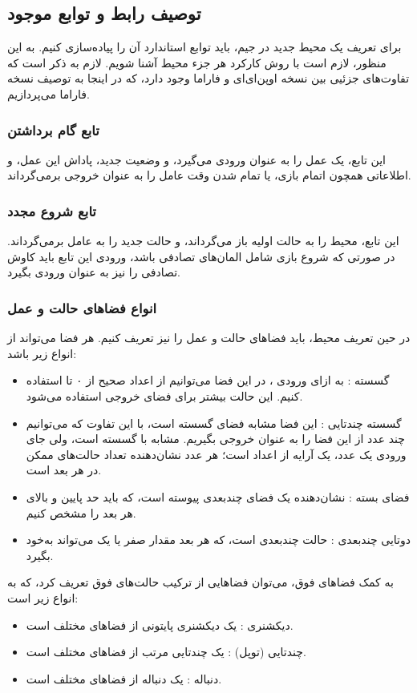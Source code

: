 \subsection{توصیف رابط و توابع موجود}
برای تعریف یک محیط جدید در جیم،
باید توابع استاندارد آن را پیاده‌سازی کنیم. به این منظور، لازم است با روش کارکرد هر جزء محیط آشنا شویم.
لازم به ذکر است که تفاوت‌های جزئیی بین نسخه اوپن‌ای‌ای و فاراما وجود دارد، که در اینجا به توصیف نسخه فاراما می‌پردازیم.
\subsubsection{تابع گام برداشتن}
این تابع، یک عمل را به عنوان ورودی می‌گیرد،
و وضعیت جدید، پاداش این عمل، و اطلاعاتی همچون اتمام بازی، یا تمام شدن وقت عامل را به عنوان خروجی برمی‌گرداند.
\subsubsection{تابع شروع مجدد}
این تابع، محیط را به حالت اولیه باز می‌گرداند، و حالت جدید را به عامل برمی‌گرداند.
در صورتی که شروع بازی شامل المان‌های تصادفی باشد، ورودی این تابع باید کاوش تصادفی  را نیز به عنوان ورودی بگیرد.
\subsubsection{انواع فضا‌های حالت و عمل}
در حین تعریف محیط، باید فضا‌های حالت و عمل را نیز تعریف کنیم.
هر فضا می‌تواند از انواع زیر باشد:
\begin{itemize}
    \item گسسته : به ازای ورودی ، در این فضا می‌توانیم از اعداد صحیح از ۰ تا  استفاده کنیم.
    این حالت بیشتر برای فضای خروجی استفاده می‌شود.
    \item گسسته چند‌تایی : این فضا مشابه فضای گسسته است، با این تفاوت که می‌توانیم چند عدد از این فضا را به عنوان خروجی بگیریم.
    مشابه با گسسته است، ولی جای ورودی یک عدد، یک آرایه از اعداد است؛ هر عدد نشان‌دهنده تعداد حالت‌های ممکن در هر بعد است.
    \item فضای بسته : نشان‌دهنده یک فضای چند‌بعدی پیوسته است، که باید حد پایین و بالای هر بعد را مشخص کنیم.
    \item دوتایی چند‌بعدی : حالت چند‌بعدی است، که هر بعد مقدار صفر یا یک می‌تواند به‌خود بگیرد.
\end{itemize}
به کمک فضا‌های فوق، می‌توان فضا‌هایی از ترکیب حالت‌های فوق تعریف کرد، که به انواع زیر است:
\begin{itemize}
    \item دیکشنری : یک دیکشنری پایتونی از فضا‌های مختلف است.
    \item چندتایی (توپل) : یک چندتایی مرتب از فضا‌های مختلف است.
    \item دنباله : یک دنباله از فضا‌های مختلف است.
\end{itemize}

